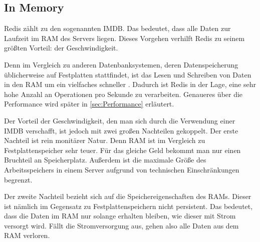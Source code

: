 
\subsection{In Memory}
\label{subsec:inMemory}

Redis zählt zu den sogenannten \ac{IMDB}. 
Das bedeutet, dass alle Daten zur Laufzeit im \ac{RAM} des Servers liegen.
Dieses Vorgehen verhilft \acs{Redis} zu seinem größten Vorteil: der Geschwindigkeit.

Denn im Vergleich zu anderen Datenbanksystemen, deren Datenspeicherung üblicherweise auf Festplatten stattfindet, ist das Lesen und Schreiben von Daten in den \acs{RAM} um ein vielfaches schneller \cite{VL_Rechnerarchitektur}.
Dadurch ist \acs{Redis} in der Lage, eine sehr hohe Anzahl an Operationen pro Sekunde zu verarbeiten.
Genaueres über die Performance wird später in \autoref{sec:Performance} erläutert.

Der Vorteil der Geschwindigkeit, den man sich durch die Verwendung einer \acs{IMDB} verschafft, ist jedoch mit zwei großen Nachteilen gekoppelt.
Der erste Nachteil ist rein monitärer Natur. 
Denn \acs{RAM} ist im Vergleich zu Festplattenspeicher sehr teuer. Für das gleiche Geld bekommt man nur einen Bruchteil an Speicherplatz.
Außerdem ist die maximale Größe des Arbeitsspeichers in einem Server aufgrund von technischen Einschränkungen begrenzt.

Der zweite Nachteil bezieht sich auf die Speichereigenschaften des \acs{RAM}s.
Dieser ist nämlich im Gegensatz zu Festplattenspeichern nicht persistent.
Das bedeutet, dass die Daten im \acs{RAM} nur solange erhalten bleiben, wie dieser mit Strom versorgt wird.
Fällt die Stromversorgung aus, gehen also alle Daten aus dem \acs{RAM} verloren. 